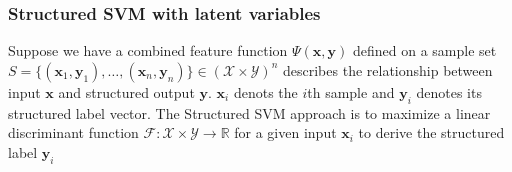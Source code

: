 \documentclass{article}
\begin{document}
	\subsubsection{Structured SVM with latent variables}
	Suppose we have a combined feature function $\Psi(\mathbf{x},\mathbf{y}) $ defined on a sample set $S=\{ ( \mathbf{x}_1,\mathbf{y}_1) ,\dots ,( \mathbf{x}_n,\mathbf{y}_n ) \} \in (\mathcal{X}\times \mathcal{Y})^n$ describes the relationship between input $\mathbf{x}$ and structured output $\mathbf{y}$. $ \mathbf{x}_i$ denots the $i$th sample and $\mathbf{y}_i$ denotes its structured label vector. The Structured SVM approach \cite{tsochantaridis2005large} is to maximize a linear discriminant function $\mathcal{F} : \mathcal{X} \times \mathcal{Y} \rightarrow \mathbb{R} $ for a given input $\mathbf{x}_i$ to derive the structured label $\mathbf{y}_i$
	
\end{document}
